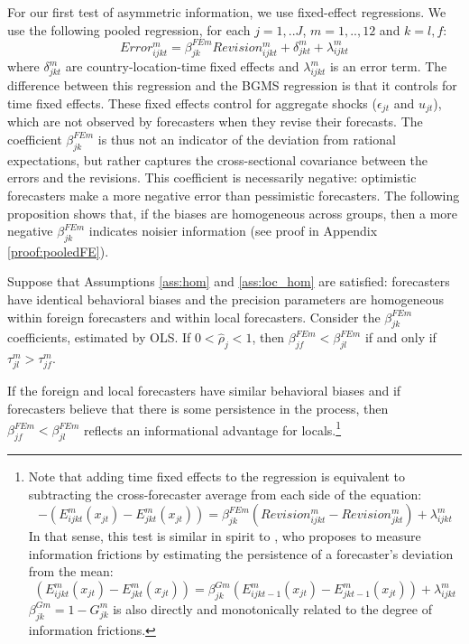 For our first test of asymmetric information, we use fixed-effect regressions. We use the following pooled regression, for each $j=1,..J$, $m=1,..,12$ and $k=l,f$:
\begin{equation}Error_{ijkt}^m=\beta^{FEm}_{jk}Revision_{ijkt}^m+\delta_{jkt}^m+\lambda_{ijkt}^m\label{eq:pooledFE}
\end{equation}
where $\delta_{jkt}^m$ are country-location-time fixed effects and $\lambda_{ijkt}^m$ is an error term. The difference between this regression and the BGMS regression is that it controls for time fixed effects. These fixed effects control for aggregate shocks ($\epsilon_{jt}$ and $u_{jt}$), which are not observed by forecasters when they revise their forecasts. The coefficient $\beta^{FEm}_{jk}$ is thus not an indicator of the deviation from rational expectations, but rather captures the cross-sectional covariance between the errors and the revisions. This coefficient is necessarily negative: optimistic forecasters make a more negative error than pessimistic forecasters. The following proposition shows that, if the biases are homogeneous across groups, then a more negative $\beta^{FEm}_{jk}$ indicates noisier information (see proof in Appendix \ref{proof:pooledFE}).
\begin{prop}\label{prop:pooledFE} Suppose that Assumptions \ref{ass:hom} and \ref{ass:loc_hom} are satisfied: forecasters have identical behavioral biases and the precision parameters are homogeneous within foreign forecasters and within local forecasters.
Consider the $\beta^{FEm}_{jk}$ coefficients, estimated by OLS. If $0<\hat\rho_j<1$, then $\beta^{FEm}_{jf}<\beta^{FEm}_{jl}$ if and only if $\tau_{jl}^m>\tau_{jf}^m$.
\end{prop}
If the foreign and local forecasters have similar behavioral biases and if forecasters believe that there is some persistence in the process, then $\beta^{FEm}_{jf}<\beta^{FEm}_{jl}$ reflects an informational advantage for locals.\footnote{Note that adding time fixed effects to the regression is equivalent to subtracting the cross-forecaster average from each side of the equation:
$$-\left(E_{ijkt}^m(x_{jt})-E_{jkt}^m(x_{jt})\right)=\beta^{FEm}_{jk}(Revision_{ijkt}^m-Revision_{jkt}^m)+\lambda_{ijkt}^m$$
In that sense, this test is similar in spirit to \citet{Goldstein2021}, who proposes to measure information frictions by estimating the persistence of a forecaster's deviation from the mean:
$$\left(E_{ijkt}^m(x_{jt})-E_{jkt}^m(x_{jt})\right)=\beta^{Gm}_{jk}\left(E_{ijkt-1}^m(x_{jt})-E_{jkt-1}^m(x_{jt})\right)+\lambda_{ijkt}^m$$
$\beta^{Gm}_{jk}=1-G^{m}_{jk}$ is also directly and monotonically related to the degree of information frictions.}

